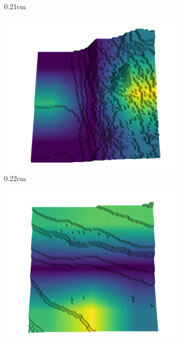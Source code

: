 \documentclass[../document.tex]{subfiles}
\begin{document}
\begin{figure}[H]
\begin{subfigure}[b]{0.242\linewidth}
            \caption{0.21cm}
            \end{subfigure}
            \begin{subfigure}[b]{0.242\linewidth}
            \includegraphics[width=\linewidth]{../img/5/quarry/false_positive/26-patch-3d-majavi-colormap-30.png}
            \caption{0.22cm}
            \end{subfigure}
            \begin{subfigure}[b]{0.242\linewidth}
            \includegraphics[width=\linewidth]{../img/5/quarry/false_positive/26-patch-3d-majavi-colormap-35.png}

\end{subfigure}
\end{figure}
\end{document}
